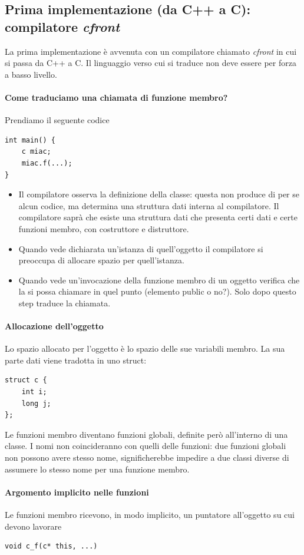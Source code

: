 \documentclass[11pt]{report}
\theoremstyle{definition}
\begin{document}
\subsection{Prima implementazione (da C++ a C): compilatore \emph{cfront}} La prima implementazione è avvenuta con un compilatore chiamato \emph{cfront} in cui si passa da C++ a C. Il linguaggio verso cui si traduce non deve essere per forza a basso livello.
\paragraph{Come traduciamo una chiamata di funzione membro?} Prendiamo il seguente codice
\begin{verbatim}
int main() {
    c miac;
    miac.f(...);
}
\end{verbatim}
\begin{itemize}
\item Il compilatore osserva la definizione della classe: questa non produce di per se alcun codice, ma determina una struttura dati interna al compilatore. Il compilatore saprà che esiste una struttura dati che presenta certi dati e certe funzioni membro, con costruttore e distruttore.
\item Quando vede dichiarata un'istanza di quell'oggetto il compilatore si preoccupa di allocare spazio per quell'istanza.
\item Quando vede un'invocazione della funzione membro di un oggetto verifica che la si possa chiamare in quel punto (elemento public o no?). Solo dopo questo step traduce la chiamata.
\end{itemize}

\paragraph{Allocazione dell'oggetto} Lo spazio allocato per l'oggetto è lo spazio delle sue variabili membro. La sua parte dati viene tradotta in uno struct:
\begin{verbatim}
struct c {
    int i;
    long j;
};
\end{verbatim}
Le funzioni membro diventano funzioni globali, definite però all'interno di una classe. I nomi non coincideranno con quelli delle funzioni: due funzioni globali non possono avere stesso nome, significherebbe impedire a due classi diverse di assumere lo stesso nome per una funzione membro.
\paragraph{Argomento implicito nelle funzioni} Le funzioni membro ricevono, in modo implicito, un puntatore all'oggetto su cui devono lavorare
\begin{verbatim}
void c_f(c* this, ...)
\end{verbatim}
\end{document}
